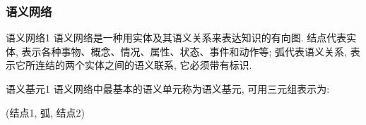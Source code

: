 \subsubsection{语义网络}
\begin{mydef}{语义网络}{1}
语义网络是一种用实体及其语义关系来表达知识的有向图.
结点代表实体, 表示各种事物、概念、情况、属性、状态、事件和动作等;
弧代表语义关系, 表示它所连结的两个实体之间的语义联系, 它必须带有标识.
\end{mydef}
\begin{mydef}{语义基元}{1}
    语义网络中最基本的语义单元称为语义基元, 可用三元组表示为:
\begin{center}
    (结点1, 弧, 结点2)
\end{center}
\end{mydef}
